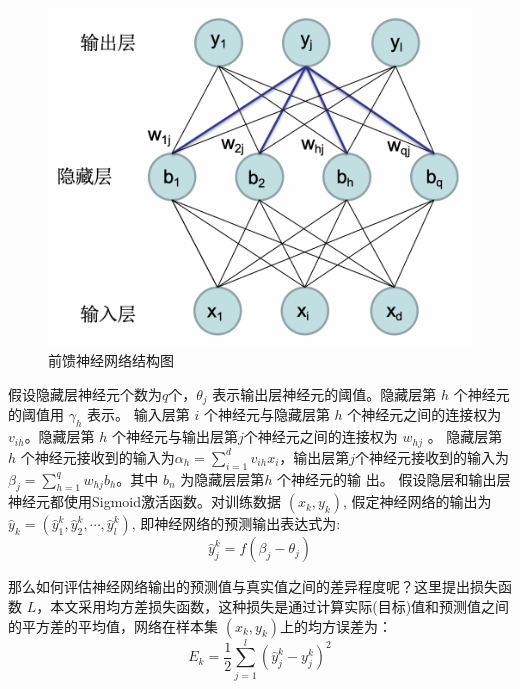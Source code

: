 \begin{figure}[!hbt]
\centering
	\includegraphics[scale=0.5]{fig2/C2/前馈神经网络}%
	\caption{前馈神经网络结构图}
	\label{fig:前馈神经网络结构图}	
\end{figure}

假设隐藏层神经元个数为$q$个，$\theta_{j}$ 表示输出层神经元的阈值。隐藏层第 $h$ 个神经元的阈值用 $\gamma_{h}$ 表示。
输入层第 $i$ 个神经元与隐藏层第 $h$ 个神经元之间的连接权为 $v_{i h}$。隐藏层第 $h$ 个神经元与输出层第$j$个神经元之间的连接权为 $w_{h j}$ 。
隐藏层第 $h$ 个神经元接收到的输入为$\alpha_{h}=\sum_{i=1}^{d} v_{i h} x_{i}$，输出层第$j$个神经元接收到的输入为$\beta_{j}=\sum_{h=1}^{q} w_{h j} b_{h}$。其中 $b_{n}$ 为隐藏层层第$h$ 个神经元的输 出。
假设隐层和输出层神经元都使用Sigmoid激活函数。对训练数据 $\left(x_{k}, y_{k}\right)$, 假定神经网络的输出为 $\hat{y}_{k}=\left(\hat{y}_{1}^{k}, \hat{y}_{2}^{k}, \cdots, \hat{y}_{l}^{k}\right)$, 即神经网络的预测输出表达式为:
\begin{equation}\label{神经网络预测输出}
\hat{y}_{j}^{k}=f\left(\beta_{j}-\theta_{j}\right)
\end{equation}

那么如何评估神经网络输出的预测值与真实值之间的差异程度呢？这里提出损失函数 $L$，本文采用均方差损失函数，这种损失是通过计算实际(目标)值和预测值之间的平方差的平均值，网络在样本集 $\left(x_{k}, y_{k}\right)$上的均方误差为：
\begin{equation}\label{神经网络损失函数}
E_{k}=\frac{1}{2} \sum_{j=1}^{l}\left(\hat{y}_{j}^{k}-y_{j}^{k}\right)^{2}
\end{equation}

